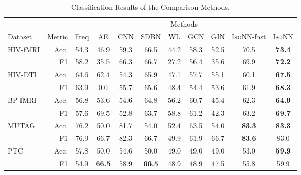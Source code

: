 \documentclass{article} \usepackage{iclr2020_conference,times}
\newcommand{\our}{\textsc{IsoNN}}
\newcommand{\ourfast}{\textsc{IsoNN}-fast}
\begin{document}
\begin{table*}[t]
	\vspace*{-20pt}
\caption{Classification Results of the Comparison Methods.}
\label{tab:classification_result}
\centering
{
	
	
	\begin{tabular}{lrccccccccc}
		\toprule
		\multicolumn{2}{l}{}&\multicolumn{9}{c}{Methods}\\
		\cmidrule{3-11}
		Dataset &Metric &Freq    &AE   &CNN   &SDBN  &WL &GCN  &GIN   &{\ourfast} &{\our}   \\
		\midrule
		\multirow{2}{*}{{HIV-fMRI}} &Acc. &54.3   &46.9 & 59.3 &66.5 &44.2     &58.3   &52.5    &70.5 &\textbf{73.4}\\
		&F1           &58.2  &35.5 &66.3 &66.7 &27.2   &56.4   &35.6   &69.9 &\textbf{72.2}\\
		\midrule
		\multirow{2}{*}{{HIV-DTI}} &Acc. &64.6   &62.4 &54.3 &65.9 &47.1     &57.7  &55.1    &60.1 &\textbf{67.5}\\
		&F1   &63.9 &0.0 &55.7 &65.6        &48.4    &54.4  &53.6   &61.9 &\textbf{68.3}\\
		\midrule
		
		\multirow{2}{*}{{BP-fMRI}} &Acc. &56.8   &53.6 &54.6 &64.8       &56.2   &60.7 &45.4   &62.3 &\textbf{64.9} \\
		&F1            &57.6 &69.5  &52.8 &63.7   &58.8  &61.2  &42.3   &63.2  &\textbf{69.7}\\
		\midrule
		
		
		\multirow{2}{*}{{MUTAG}} &Acc. &76.2   &50.0  &81.7  &54.0  &52.4   &63.5   &54.0  &\textbf{83.3} &\textbf{83.3}  \\
		&F1     &76.9   &66.7  &82.3 &66.7   &49.9  &61.9   &66.7  &\textbf{83.6} &83.0  \\
		\midrule
		
		\multirow{2}{*}{{PTC}} &Acc. &57.8   &50.0  &54.6  &50.0   &49.0    &49.0 &49.0  &53.0 &\textbf{59.9} \\
		&F1      &54.9  &\textbf{66.5}  &58.9  &\textbf{66.5}   &48.9    &48.9  &47.5   &55.8 &59.9\\
		\bottomrule

	\end{tabular}




}
\vspace*{-15pt}
\end{table*}
\end{document}
